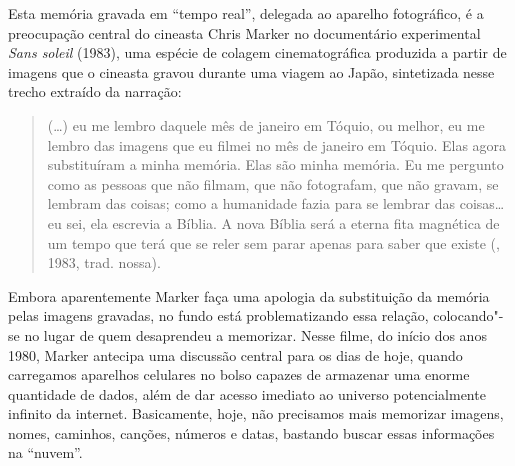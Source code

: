 Esta memória gravada em ``tempo real'', delegada ao aparelho fotográfico,
é a preocupação central do cineasta Chris Marker no documentário
experimental \emph{Sans soleil} (1983), uma espécie de colagem
cinematográfica produzida a partir de imagens que o cineasta gravou
durante uma viagem ao Japão, sintetizada nesse trecho extraído da
narração:

\begin{quote}
(\ldots{}) eu me lembro daquele mês de janeiro em Tóquio, ou melhor, eu me
lembro das imagens que eu filmei no mês de janeiro em Tóquio. Elas agora
substituíram a minha memória. Elas são minha memória. Eu me pergunto
como as pessoas que não filmam, que não fotografam, que não gravam, se
lembram das coisas; como a humanidade fazia para se lembrar das
coisas\ldots{} eu sei, ela escrevia a Bíblia. A nova Bíblia será a eterna fita
magnética de um tempo que terá que se reler sem parar apenas para saber
que existe (, 1983, trad. nossa).
\end{quote}

Embora aparentemente Marker faça uma apologia da substituição da memória
pelas imagens gravadas, no fundo está problematizando essa relação,
colocando"-se no lugar de quem desaprendeu a memorizar. Nesse filme, do
início dos anos 1980, Marker antecipa uma discussão central para os dias
de hoje, quando carregamos aparelhos celulares no bolso capazes de
armazenar uma enorme quantidade de dados, além de dar acesso imediato ao
universo potencialmente infinito da internet. Basicamente, hoje, não
precisamos mais memorizar imagens, nomes, caminhos, canções, números e
datas, bastando buscar essas informações na ``nuvem''.

